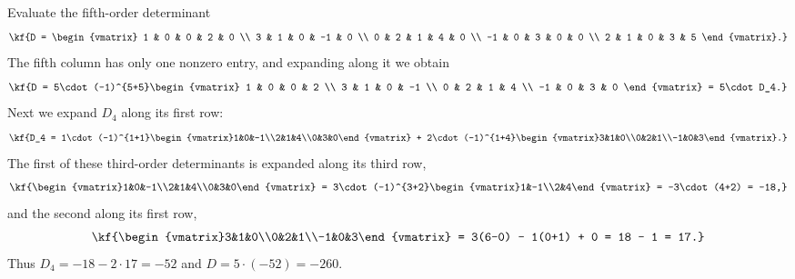 \begin{misol}
Evaluate the fifth-order determinant
\[\kf{D = \begin{vmatrix}
1 & 0 & 0 & 2 & 0 \\
3 & 1 & 0 & -1 & 0 \\
0 & 2 & 1 & 4 & 0 \\
-1 & 0 & 3 & 0 & 0 \\
2 & 1 & 0 & 3 & 5
\end{vmatrix}.}\]
The fifth column has only one nonzero entry, and expanding along it we obtain
\[\kf{D = 5\cdot(-1)^{5+5}\begin{vmatrix}
1 & 0 & 0 & 2 \\
3 & 1 & 0 & -1 \\
0 & 2 & 1 & 4 \\
-1 & 0 & 3 & 0
\end{vmatrix}
= 5\cdot D_4.}\]
Next we expand $D_4$ along its first row:
\[\kf{D_4 = 1\cdot(-1)^{1+1}\begin{vmatrix}1&0&-1\\2&1&4\\0&3&0\end{vmatrix}
+ 2\cdot(-1)^{1+4}\begin{vmatrix}3&1&0\\0&2&1\\-1&0&3\end{vmatrix}.}\]
The first of these third-order determinants is expanded along its third row,
\[\kf{\begin{vmatrix}1&0&-1\\2&1&4\\0&3&0\end{vmatrix}
= 3\cdot(-1)^{3+2}\begin{vmatrix}1&-1\\2&4\end{vmatrix}
= -3\cdot(4+2) = -18,}\]
and the second along its first row,
\[\kf{\begin{vmatrix}3&1&0\\0&2&1\\-1&0&3\end{vmatrix}
= 3(6-0) - 1(0+1) + 0 = 18 - 1 = 17.}\]
Thus $D_4 = -18 - 2\cdot 17 = -52$ and $D = 5\cdot(-52) = -260$.
\end{misol}
\bigskip
